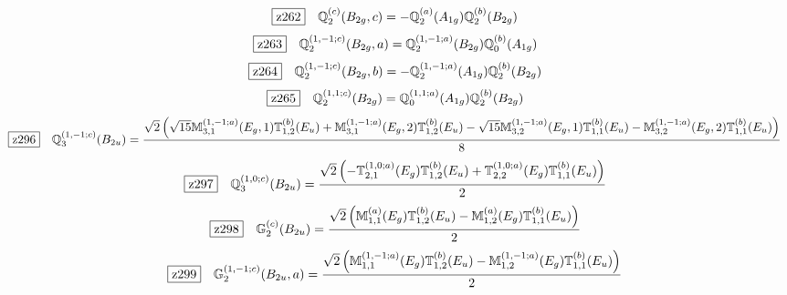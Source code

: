 \documentclass[fleqn,10pt,landscape]{jsarticle}
\begin{document}
\begin{dmath*}
\hspace*{3mm}\fbox{z262}\quad \mathbb{Q}_{2}^{(c)}(B_{2g},c)=- \mathbb{Q}_{2}^{(a)}(A_{1g}) \mathbb{Q}_{2}^{(b)}(B_{2g})
\end{dmath*}
\begin{dmath*}
\hspace*{3mm}\fbox{z263}\quad \mathbb{Q}_{2}^{(1,-1;c)}(B_{2g},a)=\mathbb{Q}_{2}^{(1,-1;a)}(B_{2g}) \mathbb{Q}_{0}^{(b)}(A_{1g})
\end{dmath*}
\begin{dmath*}
\hspace*{3mm}\fbox{z264}\quad \mathbb{Q}_{2}^{(1,-1;c)}(B_{2g},b)=- \mathbb{Q}_{2}^{(1,-1;a)}(A_{1g}) \mathbb{Q}_{2}^{(b)}(B_{2g})
\end{dmath*}
\begin{dmath*}
\hspace*{3mm}\fbox{z265}\quad \mathbb{Q}_{2}^{(1,1;c)}(B_{2g})=\mathbb{Q}_{0}^{(1,1;a)}(A_{1g}) \mathbb{Q}_{2}^{(b)}(B_{2g})
\end{dmath*}
\begin{dmath*}
\hspace*{3mm}\fbox{z296}\quad \mathbb{Q}_{3}^{(1,-1;c)}(B_{2u})=\frac{\sqrt{2} \left(\sqrt{15} \mathbb{M}_{3,1}^{(1,-1;a)}(E_{g},1) \mathbb{T}_{1,2}^{(b)}(E_{u}) + \mathbb{M}_{3,1}^{(1,-1;a)}(E_{g},2) \mathbb{T}_{1,2}^{(b)}(E_{u}) - \sqrt{15} \mathbb{M}_{3,2}^{(1,-1;a)}(E_{g},1) \mathbb{T}_{1,1}^{(b)}(E_{u}) - \mathbb{M}_{3,2}^{(1,-1;a)}(E_{g},2) \mathbb{T}_{1,1}^{(b)}(E_{u})\right)}{8}
\end{dmath*}
\begin{dmath*}
\hspace*{3mm}\fbox{z297}\quad \mathbb{Q}_{3}^{(1,0;c)}(B_{2u})=\frac{\sqrt{2} \left(- \mathbb{T}_{2,1}^{(1,0;a)}(E_{g}) \mathbb{T}_{1,2}^{(b)}(E_{u}) + \mathbb{T}_{2,2}^{(1,0;a)}(E_{g}) \mathbb{T}_{1,1}^{(b)}(E_{u})\right)}{2}
\end{dmath*}
\begin{dmath*}
\hspace*{3mm}\fbox{z298}\quad \mathbb{G}_{2}^{(c)}(B_{2u})=\frac{\sqrt{2} \left(\mathbb{M}_{1,1}^{(a)}(E_{g}) \mathbb{T}_{1,2}^{(b)}(E_{u}) - \mathbb{M}_{1,2}^{(a)}(E_{g}) \mathbb{T}_{1,1}^{(b)}(E_{u})\right)}{2}
\end{dmath*}
\begin{dmath*}
\hspace*{3mm}\fbox{z299}\quad \mathbb{G}_{2}^{(1,-1;c)}(B_{2u},a)=\frac{\sqrt{2} \left(\mathbb{M}_{1,1}^{(1,-1;a)}(E_{g}) \mathbb{T}_{1,2}^{(b)}(E_{u}) - \mathbb{M}_{1,2}^{(1,-1;a)}(E_{g}) \mathbb{T}_{1,1}^{(b)}(E_{u})\right)}{2}
\end{dmath*}
\end{document}
